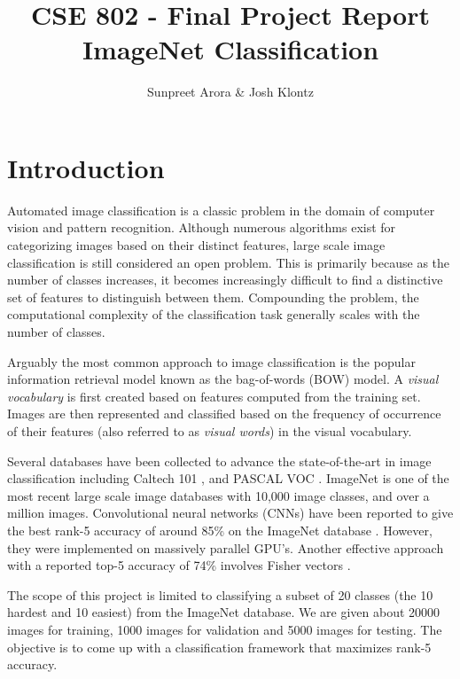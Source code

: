 \documentclass[12pt]{article}
\begin{document}
\graphicspath{{images/}}
 
\title{CSE 802 - Final Project Report\\ ImageNet Classification}
\author{Sunpreet Arora \& Josh Klontz\\
}
 
\maketitle

\section{Introduction}
Automated image classification is a classic problem in the domain of computer vision and pattern recognition.
Although numerous algorithms exist for categorizing images based on their distinct features, large scale image classification is still considered an open problem.
This is primarily because as the number of classes increases, it becomes increasingly difficult to find a distinctive set of features to distinguish between them.
Compounding the problem, the computational complexity of the classification task generally scales with the number of classes.

Arguably the most common approach to image classification is the popular information retrieval model known as the bag-of-words (BOW) model.
A \textit{visual vocabulary} is first created based on features computed from the training set.
Images are then represented and classified based on the frequency of occurrence of their features (also referred to as \textit{visual words}) in the visual vocabulary.

Several databases have been collected to advance the state-of-the-art in image classification including Caltech 101 \cite{caltech101}, and PASCAL VOC \cite{pascal09}.
ImageNet \cite{imagenet} is one of the most recent large scale image databases with 10,000 image classes, and over a million images.
Convolutional neural networks (CNNs) have been reported to give the best rank-5 accuracy of around 85\% on the ImageNet database \cite{alex2012}.
However, they were implemented on massively parallel GPU's.
Another effective approach with a reported top-5 accuracy of 74\% involves Fisher vectors \cite{csurka2011fisher}.

The scope of this project is limited to classifying a subset of 20 classes (the 10 hardest and 10 easiest) from the ImageNet database.
We are given about 20000 images for training, 1000 images for validation and 5000 images for testing.
The objective is to come up with a classification framework that maximizes rank-5 accuracy.
\end{document}
